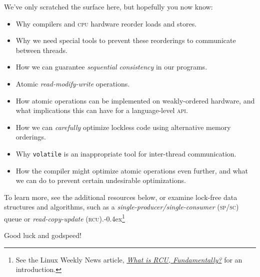 \documentclass[fontsize=10pt, numbers=endperiod]{scrartcl}
\newcommand{\punckern}{\kern-0.4ex}
\newcommand{\monobox}[1]{\mbox{\texttt{#1}}}
\newcommand{\keyword}[1]{\monobox{\color{darkGreen}#1}}
\newcommand{\introduce}[1]{\textit{#1}}
\begin{document}
\begin{multicols*}{2}
We've only scratched the surface here,
but hopefully you now know:
\begin{itemize}
\item Why compilers and \textsc{cpu} hardware reorder loads and stores.
\item Why we need special tools to prevent these reorderings
    to communicate between threads.
\item How we can guarantee \introduce{sequential consistency} in our programs.
\item Atomic \introduce{read-modify-write} operations.
\item How atomic operations can be implemented on weakly-ordered hardware,
    and what implications this can have for a language-level \textsc{api}.
\item How we can \emph{carefully} optimize lockless code using alternative
    memory orderings.
\item Why \keyword{volatile} is an inappropriate tool for inter-thread
    communication.
\item How the compiler might optimize atomic operations even further,
    and what we can do to prevent certain undesirable optimizations.
\end{itemize}
To learn more, see the additional resources below,
or examine lock-free data structures and algorithms,
such as a \introduce{single-producer/single-consumer}
\textsc{(sp/sc)} queue or \introduce{read-copy-update}
\textsc{(rcu)}.\punckern\footnote{See the Linux Weekly News article,
\href{https://lwn.net/Articles/262464/}{\textit{What is RCU, Fundamentally?}}
for an introduction.}

\vspace{\baselineskip}
\noindent Good luck and godspeed!

\end{multicols*}

\appendix
\setcounter{secnumdepth}{0}
\end{document}
